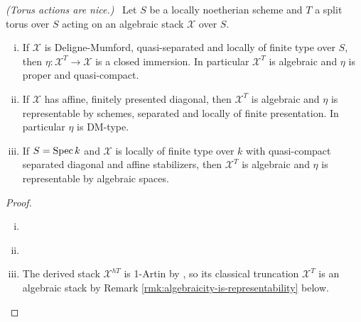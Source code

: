 \begin{lemma}\label{rl-000D}
  \label{lem:torus-actions-are-nice}
  \textit{(Torus actions are nice.)}~
  Let \(S\) be a locally noetherian scheme and \(T\) a split torus over \(S\) acting on an algebraic stack \(\mathcal X\) over \(S\).
  \begin{enumerate}[(i)]
    \item If \(\mathcal X\) is Deligne-Mumford, quasi-separated and locally of finite type over \(S\), then \(\eta:\mathcal X^T\to \mathcal X\) is a closed immersion. In particular \(\mathcal X^T\) is algebraic and \(\eta\) is proper and quasi-compact.
    \item If \(\mathcal X\) has affine, finitely presented diagonal, then \(\mathcal X^T\) is algebraic and \(\eta\) is representable by schemes, separated and locally of finite presentation. In particular \(\eta\) is DM-type.
    \item If \(S = \operatorname{Spec} k\) and \(\mathcal X\) is locally of finite type over \(k\) with quasi-compact separated diagonal and affine stabilizers, then \(\mathcal X^T\) is algebraic \cite[Thm. A.20, Rmk A.19]{aranha-khan-latyntsev-etal_VirtualLocalizationRevisited2025} and \(\eta\) is representable by algebraic spaces.
  \end{enumerate}
\end{lemma}
\begin{proof}
$ $
  \begin{enumerate}[(i)]
    \item \cite[Prop A.23]{aranha-khan-latyntsev-etal_VirtualLocalizationRevisited2025}
    \item \cite[Thm 1.2.1 (1)]{romagny_AlgebraicitySmoothnessFixed2022}
          \item The derived stack \(\mathcal X^{hT}\) is 1-Artin by \cite[Thm. A.20]{aranha-khan-latyntsev-etal_VirtualLocalizationRevisited2025}, so its classical truncation \(\mathcal X^T\) is an algebraic stack by Remark \ref{rmk:algebraicity-is-representability} below.
  \end{enumerate}
\end{proof}
